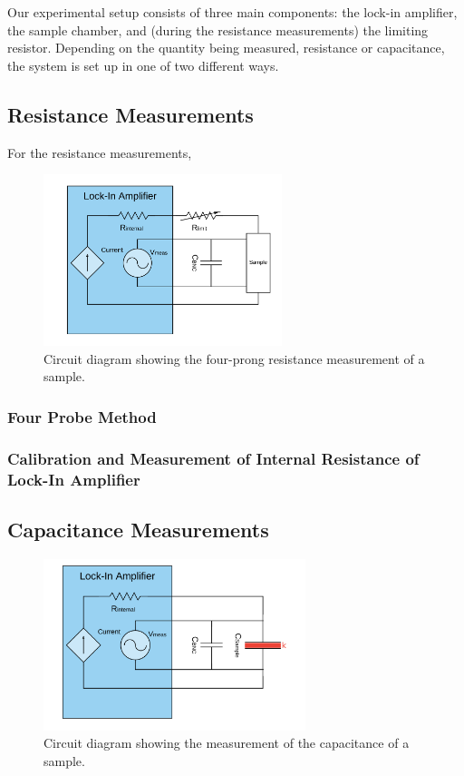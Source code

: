 \documentclass[%
 reprint,
 amsmath,amssymb,
 aps,
 pra,
]{revtex4-1}
\begin{document}
Our experimental setup consists of three main components: the lock-in amplifier, the sample chamber, and (during the resistance measurements) the limiting resistor. Depending on the quantity being measured, resistance or capacitance, the system is set up in one of two different ways.

\subsection{Resistance Measurements}

For the resistance measurements,

\begin{figure}[H]
	\centering
	\includegraphics[height=5cm]{diagram_res.png}
	\caption{Circuit diagram showing the four-prong resistance measurement of a sample.}
	\label{fig:ResistanceMeasurements}
\end{figure}

\subsubsection{Four Probe Method}

\subsubsection{Calibration and Measurement of Internal Resistance of Lock-In Amplifier}

\subsection{Capacitance Measurements}

\begin{figure}[H]
	\centering
	\includegraphics[height=5cm]{diagram_cap.png}
	\caption{Circuit diagram showing the measurement of the capacitance of a sample.}
	\label{fig:CapMeasurements}
\end{figure}
\end{document}
